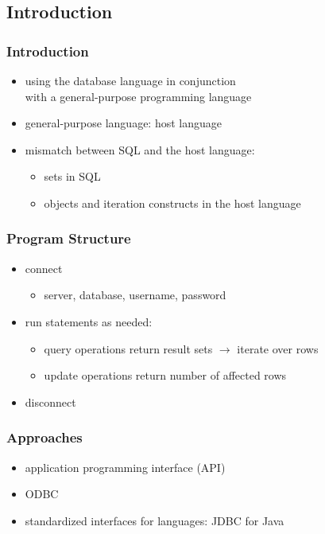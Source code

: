 \documentclass[dvipsnames]{beamer}
\theoremstyle{plain}
\begin{document}
\subsection{Introduction}

\lstset{language=C}

\begin{frame}
  \frametitle{Introduction}

  \begin{itemize}
    \item using the database language in conjunction\\
      with a general-purpose programming language
    \item general-purpose language: \alert{host language}

    \pause
    \bigskip
    \item mismatch between SQL and the host language:
    \begin{itemize}
      \item sets in SQL
      \item objects and iteration constructs in the host language
    \end{itemize}
  \end{itemize}
\end{frame}

\begin{frame}
  \frametitle{Program Structure}

  \begin{itemize}
    \item connect
    \begin{itemize}
      \item server, database, username, password
    \end{itemize}

    \pause
    \medskip
    \item run statements as needed:
    \begin{itemize}
      \item query operations return result sets $\rightarrow$ iterate over rows
      \item update operations return number of affected rows
    \end{itemize}

    \pause
    \medskip
    \item disconnect
  \end{itemize}
\end{frame}

\begin{frame}
  \frametitle{Approaches}

  \begin{itemize}
    \item application programming interface (API)
    \item ODBC
    \item standardized interfaces for languages: JDBC for Java
  \end{itemize}
\end{frame}
\end{document}
